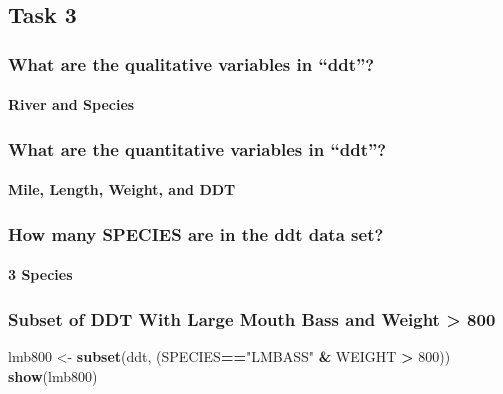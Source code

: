 \documentclass[]{article}
\newenvironment{Shaded}{\begin{snugshade}}{\end{snugshade}}
\newcommand{\KeywordTok}[1]{\textcolor[rgb]{0.13,0.29,0.53}{\textbf{#1}}}
\newcommand{\DecValTok}[1]{\textcolor[rgb]{0.00,0.00,0.81}{#1}}
\newcommand{\StringTok}[1]{\textcolor[rgb]{0.31,0.60,0.02}{#1}}
\newcommand{\OperatorTok}[1]{\textcolor[rgb]{0.81,0.36,0.00}{\textbf{#1}}}
\newcommand{\NormalTok}[1]{#1}
\let\oldparagraph\paragraph
\renewcommand{\paragraph}[1]{\oldparagraph{#1}\mbox{}}
\begin{document}
\subsection{Task 3}\label{task-3}

\subsubsection{\texorpdfstring{What are the qualitative variables in
``ddt''?}{What are the qualitative variables in ddt?}}\label{what-are-the-qualitative-variables-in-ddt}

\paragraph{River and Species}\label{river-and-species}

\subsubsection{\texorpdfstring{What are the quantitative variables in
``ddt''?}{What are the quantitative variables in ddt?}}\label{what-are-the-quantitative-variables-in-ddt}

\paragraph{Mile, Length, Weight, and
DDT}\label{mile-length-weight-and-ddt}

\subsubsection{How many SPECIES are in the ddt data
set?}\label{how-many-species-are-in-the-ddt-data-set}

\paragraph{3 Species}\label{species}

\subsubsection{Subset of DDT With Large Mouth Bass and Weight
\textgreater{}
800}\label{subset-of-ddt-with-large-mouth-bass-and-weight-800}

\begin{Shaded}
\begin{Highlighting}[]
\NormalTok{lmb800 <-}\StringTok{ }\KeywordTok{subset}\NormalTok{(ddt, (SPECIES}\OperatorTok{==}\StringTok{"LMBASS"} \OperatorTok{&}\StringTok{ }\NormalTok{WEIGHT }\OperatorTok{>}\StringTok{ }\DecValTok{800}\NormalTok{))}
\KeywordTok{show}\NormalTok{(lmb800)}
\end{Highlighting}
\end{Shaded}
\end{document}
